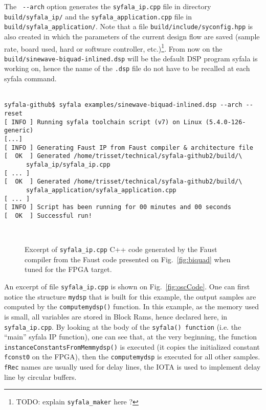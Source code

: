 The \verb# --arch# option generates the {\tt syfala\_ip.cpp} file in directory {\tt build/syfala\_ip/} and the {\tt syfala\_application.cpp} file in {\tt build/syfala\_application/}. Note that a file {\tt build/include/syconfig.hpp} is also created in which the parameters of the current design flow are saved (sample rate, board used, hard or software controller, etc.)\footnote{TODO: explain {\tt syfala\_maker} here ?}. From now on the {\tt build/sinewave-biquad-inlined.dsp} will be the default DSP program syfala is working on, hence the name of the {\tt .dsp} file do not have to be recalled at each syfala command.\\
~\\
\begin{boxedminipage}{1.03\textwidth}
  \small
\begin{verbatim}
syfala-github$ syfala examples/sinewave-biquad-inlined.dsp --arch --reset
[ INFO ] Running syfala toolchain script (v7) on Linux (5.4.0-126-generic)
[...]
[ INFO ] Generating Faust IP from Faust compiler & architecture file
[  OK  ] Generated /home/trisset/technical/syfala-github2/build/\
      syfala_ip/syfala_ip.cpp
[ ... ] 
[  OK  ] Generated /home/trisset/technical/syfala-github2/build/\
      syfala_application/syfala_application.cpp
[ ... ] 
[ INFO ] Script has been running for 00 minutes and 00 seconds
[  OK  ] Successful run!
\end{verbatim}
\end{boxedminipage}
~\\

\begin{figure}[ht] 
 \begin{boxedminipage}{\columnwidth}
    \tiny
    
  \end{boxedminipage}
  \caption{Excerpt of {\tt syfala\_ip.cpp} C++ code generated by the Faust compiler from the Faust code presented on Fig.~\ref{fig:biquad} when tuned for the FPGA target.}
  \label{fig:oscCode}
  \label{fig:biquadCode}
\end{figure}

An excerpt of file {\tt syfala\_ip.cpp} is shown on Fig.~\ref{fig:oscCode}. One can first notice the structure {\tt mydsp} that is built for this example, the output  samples are computed by the {\tt computemydsp()} function. In this example, as the memory used is small, all variables are stored in Block Rams, hence declared here, in {\tt syfala\_ip.cpp}. By looking at the body of the {\tt syfala() function} (i.e. the ``main'' syfala IP function),  one can see that, at the very beginning,  the function {\tt instanceConstantsFromMemmydsp()} is executed (it copies the initialized constant {\tt fconst0} on the FPGA), then the {\tt computemydsp} is executed for all other samples. {\tt fRec} names are usually used for delay lines, the IOTA is used to implement delay line by circular buffers.

